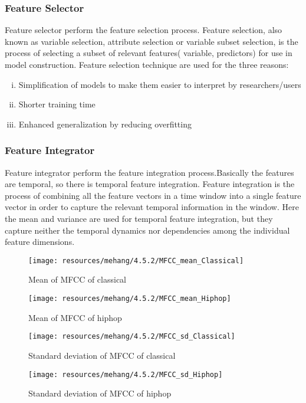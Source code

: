 \subsubsection{Feature Selector}
Feature selector perform the feature selection process. Feature selection, also known as variable 
selection, attribute selection or variable subset selection, is the process of selecting a subset of relevant features( variable, predictors) for use in model construction. Feature selection technique are used for the three reasons:
\begin{enumerate}[(i)]
        \item Simplification of models to make them easier to interpret by researchers/users
        \item Shorter training time
        \item Enhanced generalization by reducing overfitting
\end{enumerate}

\subsubsection{Feature Integrator}
Feature integrator perform the feature integration process.Basically the features are temporal, so there is temporal feature integration. Feature integration is the process of combining all the feature vectors in a time window into a single feature vector in order to capture the relevant temporal information in the window. Here the mean and variance are used for temporal feature integration, but they capture neither the temporal dynamics nor dependencies among the individual feature dimensions.
\begin{figure}[h!]
        \centering
        \texttt{[image: resources/mehang/4.5.2/MFCC\_mean\_Classical]}
        \caption{Mean of MFCC of classical}
\end{figure}
\begin{figure}[h!]
        \centering
        \texttt{[image: resources/mehang/4.5.2/MFCC\_mean\_Hiphop]}
        \caption{Mean of MFCC of hiphop}
\end{figure}
\begin{figure}[h!]
        \centering
        \texttt{[image: resources/mehang/4.5.2/MFCC\_sd\_Classical]}
        \caption{Standard deviation of MFCC of classical}
\end{figure}
\begin{figure}[h!]
        \centering
        \texttt{[image: resources/mehang/4.5.2/MFCC\_sd\_Hiphop]}
        \caption{Standard deviation of MFCC of hiphop}
\end{figure}




